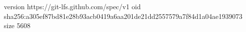 version https://git-lfs.github.com/spec/v1
oid sha256:a305ef87bd81e28b93acb0419a6aa201de21dd2557579a7f84d1a04ae1939073
size 5608
